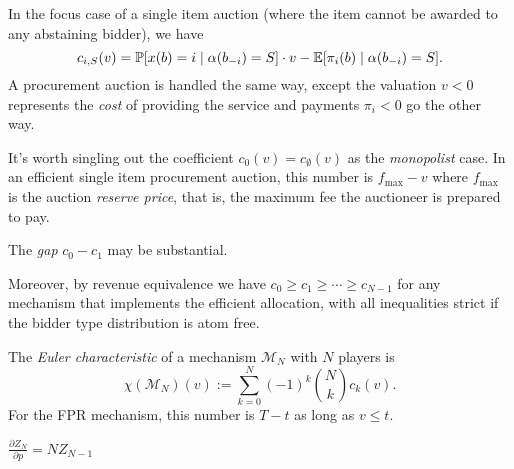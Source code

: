 \begin{example}

  In the focus case of a single item auction (where the item cannot be awarded to any abstaining bidder), we have
  \[
    c_{i,S}(v) = \mathbb{P}[x(b)=i\mid \alpha(b_{-i})=S]\cdot v - \mathbb{E}[\pi_i(b)\mid \alpha(b_{-i})=S].
  \]
  A procurement auction is handled the same way, except the valuation $v<0$ represents the \emph{cost} of providing the service and payments $\pi_i<0$ go the other way.

\end{example}

It's worth singling out the coefficient $c_0(v)=c_\emptyset(v)$ as the \emph{monopolist} case.
%
In an efficient single item procurement auction, this number is $f_{\max}-v$ where $f_{\max}$ is the auction \emph{reserve price}, that is, the maximum fee the auctioneer is prepared to pay.

The \emph{gap} $c_0-c_1$ may be substantial.

Moreover, by revenue equivalence we have $c_0 \geq c_1 \geq \cdots \geq c_{N-1}$ for any mechanism that implements the efficient allocation, with all inequalities strict if the bidder type distribution is atom free.


\begin{definition}

  The \emph{Euler characteristic} of a mechanism $\mathcal{M}_N$ with $N$ players is
  \[
    \chi(\mathcal{M}_N)(v) := \sum_{k=0}^{N} (-1)^k { N \choose k } c_k(v).
  \]
  For the FPR mechanism, this number is $T-t$ as long as $v\leq t$.

\end{definition}

\begin{lemma} $\frac{\partial Z_N}{\partial p} = NZ_{N-1}$ \end{lemma}

